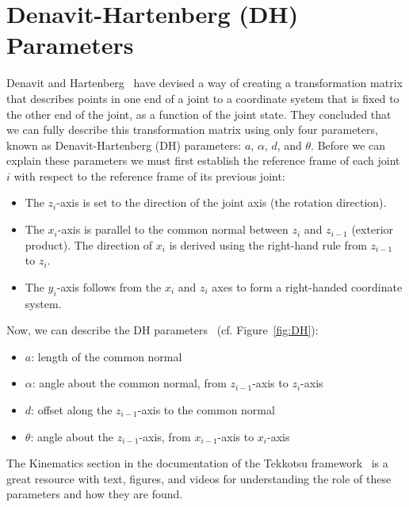 \section{Denavit-Hartenberg (DH) Parameters}
Denavit and Hartenberg~\cite{dhparam1,dhparam2} have devised a way of creating a transformation matrix that describes points in one end of a joint to a coordinate system that is fixed to the other end of the joint, as a function of the joint state. They concluded that we can fully describe this transformation matrix using only four parameters, known as Denavit-Hartenberg (DH) parameters: $a$, $\alpha$, $d$, and $\theta$. Before we can explain these parameters we must first establish the reference frame of each joint $i$ with respect to the reference frame of its previous joint:
\begin{itemize}
\item The $z_i$-axis is set to the direction of the joint axis (the rotation direction). 
\item The $x_i$-axis is parallel to the common normal between $z_i$ and $z_{i-1}$ (exterior product). The direction of $x_i$ is derived using the right-hand rule from $z_{i-1}$ to $z_i$.
\item The $y_i$-axis follows from the $x_i$ and $z_i$ axes to form a right-handed coordinate system.
\end{itemize}
Now, we can describe the DH parameters~\cite{introroboticscraigbook} (cf. Figure~\ref{fig:DH}):
\begin{itemize}
\item$a$: length of the common normal
\item$\alpha$: angle about the common normal, from $z_{i-1}$-axis to $z_i$-axis
\item$d$: offset along the $z_{i-1}$-axis to the common normal
\item$\theta$: angle about the $z_{i-1}$-axis, from $x_{i-1}$-axis to $x_i$-axis
\end{itemize}
The Kinematics section in the documentation of the Tekkotsu framework~\cite{tekkotsu} is a great resource with text, figures, and videos for understanding the role of these parameters and how they are found.

